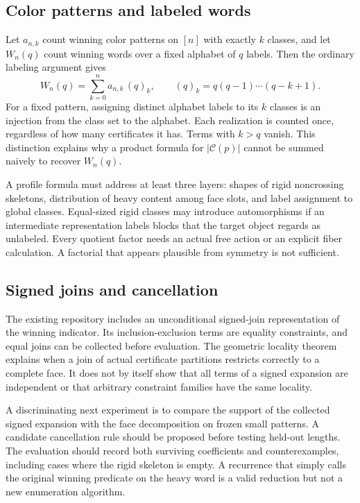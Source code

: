 \documentclass[11pt,reqno]{amsart}
\theoremstyle{definition}
\newcommand{\Cert}{\mathcal C}
\newcommand{\card}[1]{\lvert #1\rvert}
\begin{document}
\subsection{Color patterns and labeled words}
Let $a_{n,k}$ count winning color patterns on $[n]$ with exactly $k$ classes,
and let $W_n(q)$ count winning words over a fixed alphabet of $q$ labels.
Then the ordinary labeling argument gives
\[
 W_n(q)=\sum_{k=0}^{n}a_{n,k}\,(q)_{\underline{k}},
 \qquad
 (q)_{\underline{k}}=q(q-1)\cdots(q-k+1).
\]
For a fixed pattern, assigning distinct alphabet labels to its $k$ classes
is an injection from the class set to the alphabet. Each realization is
counted once, regardless of how many certificates it has. Terms with $k>q$
vanish. This distinction explains why a product formula for $\card{\Cert(p)}$
cannot be summed naively to recover $W_n(q)$.

A profile formula must address at least three layers: shapes of rigid
noncrossing skeletons, distribution of heavy content among face slots, and
label assignment to global classes. Equal-sized rigid classes may introduce
automorphisms if an intermediate representation labels blocks that the
target object regards as unlabeled. Every quotient factor needs an actual
free action or an explicit fiber calculation. A factorial that appears
plausible from symmetry is not sufficient.

\subsection{Signed joins and cancellation}
The existing repository includes an unconditional signed-join representation
of the winning indicator. Its inclusion-exclusion terms are equality
constraints, and equal joins can be collected before evaluation.
The geometric locality theorem explains when a join of actual certificate
partitions restricts correctly to a complete face. It does not by itself show
that all terms of a signed expansion are independent or that arbitrary
constraint families have the same locality.

A discriminating next experiment is to compare the support of the collected
signed expansion with the face decomposition on frozen small patterns.
A candidate cancellation rule should be proposed before testing held-out
lengths. The evaluation should record both surviving coefficients and
counterexamples, including cases where the rigid skeleton is empty.
A recurrence that simply calls the original winning predicate on the heavy
word is a valid reduction but not a new enumeration algorithm.
\end{document}
